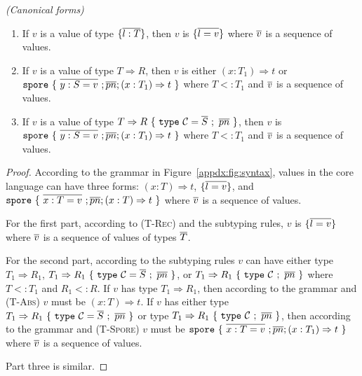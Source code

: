 \begin{lemma}
\emph{(Canonical forms)}
\label{appdx:lem:canonical}
\begin{enumerate}

\item If $v$ is a value of type $\{ \overline{l : T} \}$, then $v$ is $\{ \overline{l = v} \}$ where $\overline{v}$ is a sequence of values.

\item If $v$ is a value of type $T \Rightarrow R$, then $v$ is either $(x: T_1) \Rightarrow t$ or \\ $\texttt{spore}~\{~\overline{y : S = v}~; \overline{pn} ; (x: T_1) \Rightarrow t~\}$ where $T <: T_1$ and $\overline{v}$ is a sequence of values.

\item If $v$ is a value of type $T \Rightarrow R~\{~\texttt{type}~\mathcal{C} = \overline{S}~;~\overline{pn}~\}$, then $v$ is \\ $\texttt{spore}~\{~\overline{y : S = v}~; \overline{pn} ; (x: T_1) \Rightarrow t~\}$ where $T <: T_1$ and $\overline{v}$ is a sequence of values.


\end{enumerate}
\end{lemma}
\begin{proof}
According to the grammar in Figure~\ref{appdx:fig:syntax}, values in the core language
can have three forms: $(x: T) \Rightarrow t$, $\{ \overline{l = v} \}$, and
$\texttt{spore}~\{~\overline{x : T = v}~; \overline{pn} ; (x: T) \Rightarrow t~\}$ where
$\overline{v}$ is a sequence of values.

For the first part, according to (\textsc{T-Rec}) and the subtyping rules, $v$
is $\{ \overline{l = v} \}$ where $\overline{v}$ is a sequence of values of types
$\overline{T}$.

For the second part, according to the subtyping rules $v$ can have either type
$T_1 \Rightarrow R_1$, $T_1 \Rightarrow R_1~\{~\texttt{type}~\mathcal{C} =
\overline{S}~;~\overline{pn}~\}$, or $T_1 \Rightarrow
R_1~\{~\texttt{type}~\mathcal{C}~;~\overline{pn}~\}$ where $T <: T_1$ and $R_1 <: R$.
If $v$ has type $T_1 \Rightarrow R_1$, then according to the grammar and
(\textsc{T-Abs}) $v$ must be $(x: T) \Rightarrow t$. If $v$ has either type $T_1
\Rightarrow R_1~\{~\texttt{type}~\mathcal{C} = \overline{S}~;~\overline{pn}~\}$ or type
$T_1 \Rightarrow R_1~\{~\texttt{type}~\mathcal{C}~;~\overline{pn}~\}$, then according
to the grammar and (\textsc{T-Spore}) $v$ must be $\texttt{spore}~\{~\overline{x : T =
v}~; \overline{pn} ; (x: T_1) \Rightarrow t~\}$ where $\overline{v}$ is a sequence of
values.

Part three is similar.
\end{proof}


